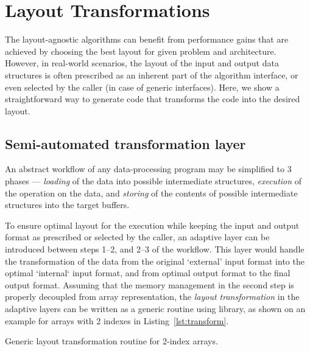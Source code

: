 \section{Layout Transformations}\label{sec:transformations}

The layout-agnostic algorithms can benefit from performance gains that are achieved by choosing the best layout for given problem and architecture. However, in real-world scenarios, the layout of the input and output data structures is often prescribed as an inherent part of the algorithm interface, or even selected by the caller (in case of generic interfaces). Here, we show a straightforward way to generate code that transforms the code into the desired layout.


\subsection{Semi-automated transformation layer}

An abstract workflow of any data-processing program may be simplified to 3 phases --- \emph{loading} of the data into possible intermediate structures, \emph{execution} of the operation on the data, and \emph{storing} of the contents of possible intermediate structures into the target buffers.

To ensure optimal layout for the execution while keeping the input and output format as prescribed or selected by the caller, an adaptive layer can be introduced between steps 1--2, and 2--3 of the workflow. This layer would handle the transformation of the data from the original `external' input format into the optimal `internal` input format, and from optimal output format to the final output format. Assuming that the memory management in the second step is properly decoupled from array representation, the \emph{layout transformation} in the adaptive layers can be written as a generic routine using \Noarr{} library, as shown on an example for arrays with 2 indexes in Listing~\ref{lst:transform}.

\begin{listing}
    \vspace{-10pt}
    \vspace{-20pt}
    \caption{Generic layout transformation routine for 2-index arrays.}
    \label{lst:transform}
\end{listing}

